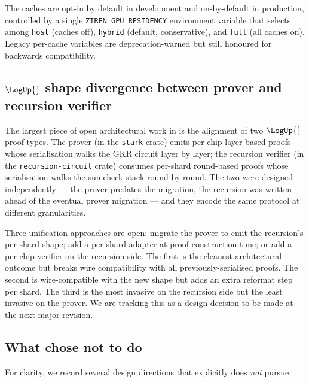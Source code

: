 The caches are opt-in by default in development and on-by-default in production, controlled by a single \texttt{ZIREN\_GPU\_RESIDENCY} environment variable that selects among \texttt{host} (caches off), \texttt{hybrid} (default, conservative), and \texttt{full} (all caches on). Legacy per-cache variables are deprecation-warned but still honoured for backwards compatibility.

\subsection{$\LogUp{}$ shape divergence between prover and recursion verifier}
\label{sec:logup-divergence}

The largest piece of open architectural work in \Zirenver{} is the alignment of two $\LogUp{}$ proof types. The prover (in the \texttt{stark} crate) emits per-chip layer-based proofs whose serialisation walks the GKR circuit layer by layer; the recursion verifier (in the \texttt{recursion-circuit} crate) consumes per-shard round-based proofs whose serialisation walks the sumcheck stack round by round. The two were designed independently --- the prover predates the migration, the recursion was written ahead of the eventual prover migration --- and they encode the same protocol at different granularities.

Three unification approaches are open: migrate the prover to emit the recursion's per-shard shape; add a per-shard adapter at proof-construction time; or add a per-chip verifier on the recursion side. The first is the cleanest architectural outcome but breaks wire compatibility with all previously-serialised proofs. The second is wire-compatible with the new shape but adds an extra reformat step per shard. The third is the most invasive on the recursion side but the least invasive on the prover. We are tracking this as a design decision to be made at the next major revision.

\subsection{What \Zirenver{} chose not to do}

For clarity, we record several design directions that \Zirenver{} explicitly does \emph{not} pursue.

